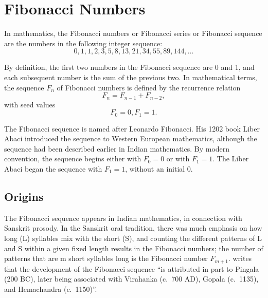 \chapter{Fibonacci Numbers}

In mathematics, the Fibonacci numbers or Fibonacci series or Fibonacci sequence are the numbers in the following integer sequence:
%
\begin{equation*} %
0, 1, 1, 2, 3,5,8,13,21,34,55,89,144,\ldots
\end{equation*}

By definition, the first two numbers in the Fibonacci sequence are 0 and 1, and each subsequent number is the sum of the previous two. In mathematical terms, the sequence $F_n$ of Fibonacci numbers is defined by the recurrence relation
%
\begin{equation}
F_n = F_{n-1} + F_{n-2},
\end{equation}
%
with seed values
%
\begin{equation}
F_0 = 0, F_1 = 1.
\end{equation}

The Fibonacci sequence is named after Leonardo Fibonacci. His 1202 book Liber Abaci introduced the sequence to Western European mathematics, although the sequence had been described earlier in Indian mathematics. \cite{Goonatilake:1998} By modern convention, the sequence begins either with $F_0 = 0$ or with $F_1 = 1$. The Liber Abaci began the sequence with $F_1 = 1$, without an initial 0.


\section{Origins}

The Fibonacci sequence appears in Indian mathematics, in connection with Sanskrit prosody. \cite{Singh:1985} In the Sanskrit oral tradition, there was much emphasis on how long (L) syllables mix with the short (S), and counting the different patterns of L and S within a given fixed length results in the Fibonacci numbers; the number of patterns that are m short syllables long is the Fibonacci number $F_{m + 1}$.
\citet{Goonatilake:1998} writes that the development of the Fibonacci sequence ``is attributed in part to Pingala (200 BC), later being associated with Virahanka (c.~700 AD), Gopala (c.~1135), and Hemachandra (c.~1150)''.

